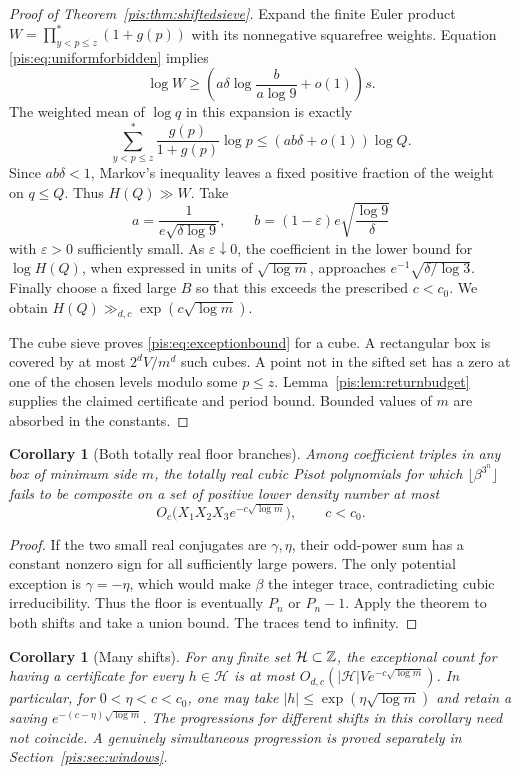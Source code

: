 \documentclass[11pt,a4paper]{article}
\newtheorem{corollary}[theorem]{Corollary}
\theoremstyle{definition}\newtheorem{definition}[theorem]{Definition}
\theoremstyle{remark}\newtheorem{remark}[theorem]{Remark}
\begin{document}
\begin{proof}[Proof of Theorem~\ref{pis:thm:shiftedsieve}]
Expand the finite Euler product $W=\prod_{y<p\le z}^{*}(1+g(p))$
with its nonnegative squarefree weights. Equation
\eqref{pis:eq:uniformforbidden} implies
\[
 \log W\ge
 \left(a\delta\log\frac b{a\log9}+o(1)\right)s.
\]
The weighted mean of $\log q$ in this expansion is exactly
\[
 \sum_{y<p\le z}^{*}\frac{g(p)}{1+g(p)}\log p
 \le (ab\delta+o(1))\log Q.
\]
Since $ab\delta<1$, Markov's inequality leaves a fixed positive
fraction of the weight on $q\le Q$. Thus $H(Q)\gg W$.
Take
\[
 a=\frac1{e\sqrt{\delta\log9}},\qquad
 b=(1-\varepsilon)e\sqrt{\frac{\log9}{\delta}}
\]
with $\varepsilon>0$ sufficiently small. As $\varepsilon\downarrow0$,
the coefficient in the lower bound for $\log H(Q)$, when expressed
in units of $\sqrt{\log m}$, approaches
$e^{-1}\sqrt{\delta/\log3}$. Finally choose a fixed large $B$ so
that this exceeds the prescribed $c<c_0$. We obtain
$H(Q)\gg_{d,c}\exp(c\sqrt{\log m})$.

The cube sieve proves \eqref{pis:eq:exceptionbound} for a cube. A
rectangular box is covered by at most $2^dV/m^d$ such cubes. A point
not in the sifted set has a zero at one of the chosen levels modulo
some $p\le z$. Lemma~\ref{pis:lem:returnbudget} supplies the claimed
certificate and period bound. Bounded values of $m$ are absorbed
in the constants.
\end{proof}

\begin{corollary}[Both totally real floor branches]\label{pis:cor:floorbox}
Among coefficient triples in any box of minimum side $m$, the
totally real cubic Pisot polynomials for which
$\lfloor\beta^{3^n}\rfloor$ fails to be composite on a set of
positive lower density number at most
\[
 O_c\bigl(X_1X_2X_3e^{-c\sqrt{\log m}}\bigr),\qquad c<c_0.
\]
\end{corollary}
\begin{proof}
If the two small real conjugates are $\gamma,\eta$, their odd-power
sum has a constant nonzero sign for all sufficiently large powers.
The only potential exception is $\gamma=-\eta$, which would make
$\beta$ the integer trace, contradicting cubic irreducibility.
Thus the floor is eventually $P_n$ or $P_n-1$. Apply the theorem
to both shifts and take a union bound. The traces tend to infinity.
\end{proof}

\begin{corollary}[Many shifts]\label{pis:cor:manyshifts}
For any finite set $\mathcal H\subset\mathbb Z$, the exceptional count for
having a certificate for every $h\in\mathcal H$ is at most
$O_{d,c}(|\mathcal H|V e^{-c\sqrt{\log m}})$.
In particular, for $0<\eta<c<c_0$, one may take
$|h|\le\exp(\eta\sqrt{\log m})$ and retain a saving
$e^{-(c-\eta)\sqrt{\log m}}$.
The progressions for different shifts in this corollary need not
coincide. A genuinely simultaneous progression is proved separately
in Section~\ref{pis:sec:windows}.
\end{corollary}
\end{document}
